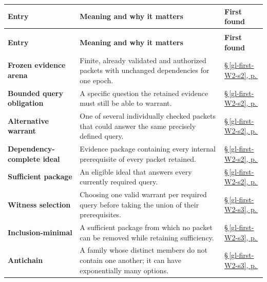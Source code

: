 \documentclass[10pt,letterpaper]{article}
\theoremstyle{definition}
\theoremstyle{remark}
\begin{document}
\begin{longtable}{@{}>{\raggedright\arraybackslash}p{.215\linewidth}>{\raggedright\arraybackslash}p{.585\linewidth}>{\raggedright\arraybackslash}p{.14\linewidth}@{}}
\toprule
\textbf{Entry} & \textbf{Meaning and why it matters} & \textbf{First found} \\
\midrule\endfirsthead
\multicolumn{3}{@{}l}{\footnotesize \emph{Argot: Specialized Terms (continued)}}\\
\toprule\textbf{Entry} & \textbf{Meaning and why it matters} & \textbf{First found} \\
\midrule\endhead
\bottomrule\endfoot
\textbf{Frozen evidence arena} & Finite, already validated and authorized packets with unchanged dependencies for one epoch. & \hyperref[gl-first-W2-s2]{\S\,\ref*{gl-first-W2-s2}, p.\,\pageref*{gl-first-W2-s2}} \\
\textbf{Bounded query obligation} & A specific question the retained evidence must still be able to warrant. & \hyperref[gl-first-W2-s2]{\S\,\ref*{gl-first-W2-s2}, p.\,\pageref*{gl-first-W2-s2}} \\
\textbf{Alternative warrant} & One of several individually checked packets that could answer the same precisely defined query. & \hyperref[gl-first-W2-s2]{\S\,\ref*{gl-first-W2-s2}, p.\,\pageref*{gl-first-W2-s2}} \\
\textbf{Dependency-complete ideal} & Evidence package containing every internal prerequisite of every packet retained. & \hyperref[gl-first-W2-s2]{\S\,\ref*{gl-first-W2-s2}, p.\,\pageref*{gl-first-W2-s2}} \\
\textbf{Sufficient package} & An eligible ideal that answers every currently required query. & \hyperref[gl-first-W2-s2]{\S\,\ref*{gl-first-W2-s2}, p.\,\pageref*{gl-first-W2-s2}} \\
\textbf{Witness selection} & Choosing one valid warrant per required query before taking the union of their prerequisites. & \hyperref[gl-first-W2-s3]{\S\,\ref*{gl-first-W2-s3}, p.\,\pageref*{gl-first-W2-s3}} \\
\textbf{Inclusion-minimal} & A sufficient package from which no packet can be removed while retaining sufficiency. & \hyperref[gl-first-W2-s3]{\S\,\ref*{gl-first-W2-s3}, p.\,\pageref*{gl-first-W2-s3}} \\
\textbf{Antichain} & A family whose distinct members do not contain one another; it can have exponentially many options. & \hyperref[gl-first-W2-s3]{\S\,\ref*{gl-first-W2-s3}, p.\,\pageref*{gl-first-W2-s3}} \\

\end{longtable}
\end{document}

